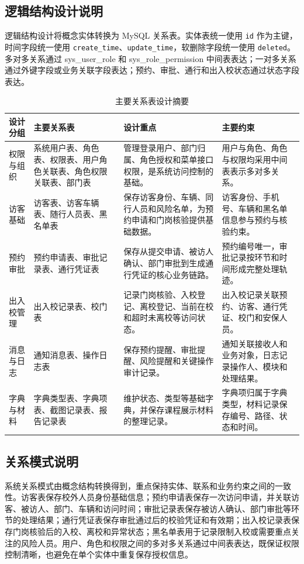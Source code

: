 \subsection{逻辑结构设计说明}
逻辑结构设计将概念实体转换为 MySQL 关系表。实体表统一使用 \texttt{id} 作为主键，时间字段统一使用 \texttt{create\_time}、\texttt{update\_time}，软删除字段统一使用 \texttt{deleted}。多对多关系通过 sys\_user\_role 和 sys\_role\_permission 中间表表达；一对多关系通过外键字段或业务关联字段表达；预约、审批、通行和出入校状态通过状态字段表达。
\begin{longtable}{>{\raggedright\arraybackslash}p{}>{\raggedright\arraybackslash}p{}>{\raggedright\arraybackslash}p{}>{\raggedright\arraybackslash}p{}}
\caption{主要关系表设计摘要}\\
\toprule
设计分组 & 主要关系表 & 设计重点 & 主要约束 \\
\midrule
权限与组织 & 系统用户表、角色表、权限表、用户角色关联表、角色权限关联表、部门表 & 管理登录用户、部门归属、角色授权和菜单接口权限，是系统访问控制的基础。 & 用户与角色、角色与权限均采用中间表表示多对多关系。 \\
访客基础 & 访客表、访客车辆表、随行人员表、黑名单表 & 保存访客身份、车辆、同行人员和风险名单，为预约申请和门岗核验提供基础数据。 & 访客身份、手机号、车辆和黑名单信息参与预约与核验约束。 \\
预约审批 & 预约申请表、审批记录表、通行凭证表 & 保存从提交申请、被访人确认、部门审批到生成通行凭证的核心业务链路。 & 预约编号唯一，审批记录按环节和时间形成完整处理轨迹。 \\
出入校管理 & 出入校记录表、校门表 & 记录门岗核验、入校登记、离校登记、当前在校和超时未离校等访问状态。 & 出入校记录关联预约、访客、通行凭证、校门和安保人员。 \\
消息与日志 & 通知消息表、操作日志表 & 保存预约提醒、审批提醒、风险提醒和关键操作审计记录。 & 通知关联接收人和业务对象，日志记录操作人、模块和处理结果。 \\
字典与材料 & 字典类型表、字典项表、截图记录表、报告记录表 & 维护状态、类型等基础字典，并保存课程展示材料的整理记录。 & 字典项归属于字典类型，材料记录保存编号、路径、状态和时间。 \\
\bottomrule
\end{longtable}
\subsection{关系模式说明}
系统关系模式由概念结构转换得到，重点保持实体、联系和业务约束之间的一致性。访客表保存校外人员身份基础信息；预约申请表保存一次访问申请，并关联访客、被访人、部门、车辆和访问时间；审批记录表保存被访人确认、部门审批等环节的处理结果；通行凭证表保存审批通过后的校验凭证和有效期；出入校记录表保存门岗核验后的入校、离校和异常状态；黑名单表用于记录限制入校或需要重点关注的风险人员。用户、角色和权限之间的多对多关系通过中间表表达，既保证权限控制清晰，也避免在单个实体中重复保存授权信息。

